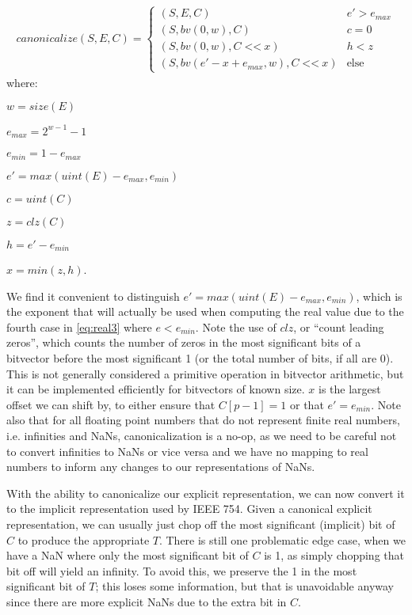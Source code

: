 \documentclass[letterpaper,10pt]{article}
\begin{document}
\begin{align} \label{eq:canon}
 canonicalize(S, E, C) =
 \begin{cases}
  (S, E, C)                                             & e' > e_{max} \\
  (S, bv(0, w), C)                                      & c = 0       \\
  (S, bv(0, w), C \;\texttt{<<}\: x)                    & h < z       \\
  (S, bv(e' - x + e_{max}, w), C \;\texttt{<<}\: x) & \text{else}
 \end{cases}
\end{align}
where:
\begin{description}
 \item $w = size(E)$
 \item $e_{max} = 2^{w-1} - 1$
 \item $e_{min} = 1 - e_{max}$
 \item $e' = max(uint(E) - e_{max}, e_{min})$
 \item $c = uint(C)$
 \item $z = clz(C)$
 \item $h = e' - e_{min}$
 \item $x = min(z, h)$.
\end{description}

We find it convenient to distinguish $e' = max(uint(E) - e_{max}, e_{min})$, which is the exponent that will actually be used when computing the real value due to the fourth case in \ref{eq:real3} where $e < e_{min}$. Note the use of $clz$, or ``count leading zeros'', which counts the number of zeros in the most significant bits of a bitvector before the most significant 1 (or the total number of bits, if all are 0). This is not generally considered a primitive operation in bitvector arithmetic, but it can be implemented efficiently for bitvectors of known size. $x$ is the largest offset we can shift by, to either ensure that $C[p-1] = 1$ or that $e' = e_{min}$. Note also that for all floating point numbers that do not represent finite real numbers, i.e. infinities and NaNs, canonicalization is a no-op, as we need to be careful not to convert infinities to NaNs or vice versa and we have no mapping to real numbers to inform any changes to our representations of NaNs.

With the ability to canonicalize our explicit representation, we can now convert it to the implicit representation used by IEEE 754. Given a canonical explicit representation, we can usually just chop off the most significant (implicit) bit of $C$ to produce the appropriate $T$. There is still one problematic edge case, when we have a NaN where only the most significant bit of $C$ is 1, as simply chopping that bit off will yield an infinity. To avoid this, we preserve the 1 in the most significant bit of $T$; this loses some information, but that is unavoidable anyway since there are more explicit NaNs due to the extra bit in $C$.
\end{document}

